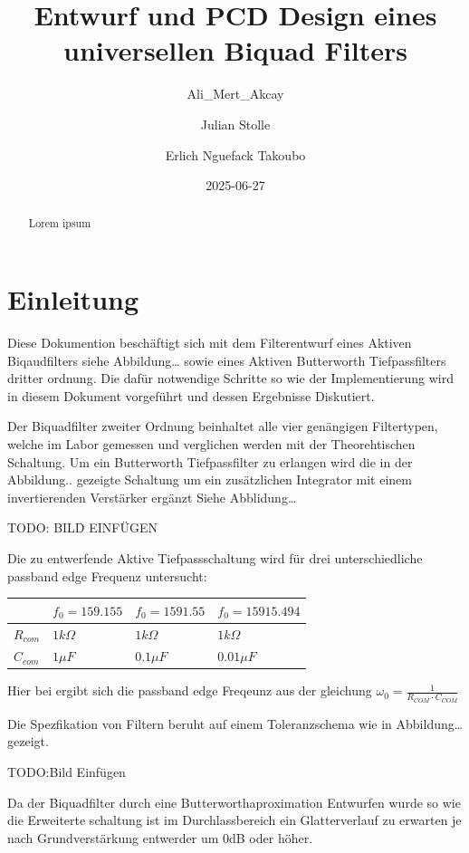 \documentclass[
  ngerman,
  letterpaper,
  DIV=11]{scrreprt}
\title{Entwurf und PCD Design eines universellen Biquad Filters}
\author{Ali\_Mert\_Akcay \and Julian Stolle \and Erlich Nguefack
Takoubo}
\date{2025-06-27}
\renewcommand*\contentsname{Inhaltsverzeichnis}
\newcommand\contentsname{Inhaltsverzeichnis}
\begin{document}
\maketitle
\begin{abstract}
Lorem ipsum
\end{abstract}

\renewcommand*\contentsname{Inhaltsverzeichnis}
{
\hypersetup{linkcolor=}
\setcounter{tocdepth}{2}
\tableofcontents
}

\chapter{Einleitung}\label{einleitung}

Diese Dokumention beschäftigt sich mit dem Filterentwurf eines Aktiven
Biqaudfilters siehe Abbildung\ldots{} sowie eines Aktiven Butterworth
Tiefpassfilters dritter ordnung. Die dafür notwendige Schritte so wie
der Implementierung wird in diesem Dokument vorgeführt und dessen
Ergebnisse Diskutiert.

Der Biquadfilter zweiter Ordnung beinhaltet alle vier genängigen
Filtertypen, welche im Labor gemessen und verglichen werden mit der
Theorehtischen Schaltung. Um ein Butterworth Tiefpassfilter zu erlangen
wird die in der Abbildung.. gezeigte Schaltung um ein zusätzlichen
Integrator mit einem invertierenden Verstärker ergänzt Siehe
Abblidung\ldots{}

TODO: BILD EINFÜGEN

Die zu entwerfende Aktive Tiefpassschaltung wird für drei
unterschiedliche passband edge Frequenz untersucht:

\begin{longtable}[]{@{}llll@{}}
\toprule\noalign{}
& \(f_0 = 159.155\) & \(f_0 = 1591.55\) & \(f_0 =15915.494\) \\
\midrule\noalign{}
\endhead
\bottomrule\noalign{}
\endlastfoot
\(R_{com}\) & \(1k\Omega\) & \(1k\Omega\) & \(1k\Omega\) \\
\(C_{com}\) & \(1\mu F\) & \(0.1 \mu F\) & \(0.01 \mu F\) \\
\end{longtable}

Hier bei ergibt sich die passband edge Freqeunz aus der gleichung
\(\omega_0 = \frac{1}{R_{COM} \cdot C_{COM}}\)

Die Spezfikation von Filtern beruht auf einem Toleranzschema wie in
Abbildung\ldots{} gezeigt.

TODO:Bild Einfügen

Da der Biquadfilter durch eine Butterworthaproximation Entwurfen wurde
so wie die Erweiterte schaltung ist im Durchlassbereich ein
Glatterverlauf zu erwarten je nach Grundverstärkung entwerder um 0dB
oder höher.
\end{document}
